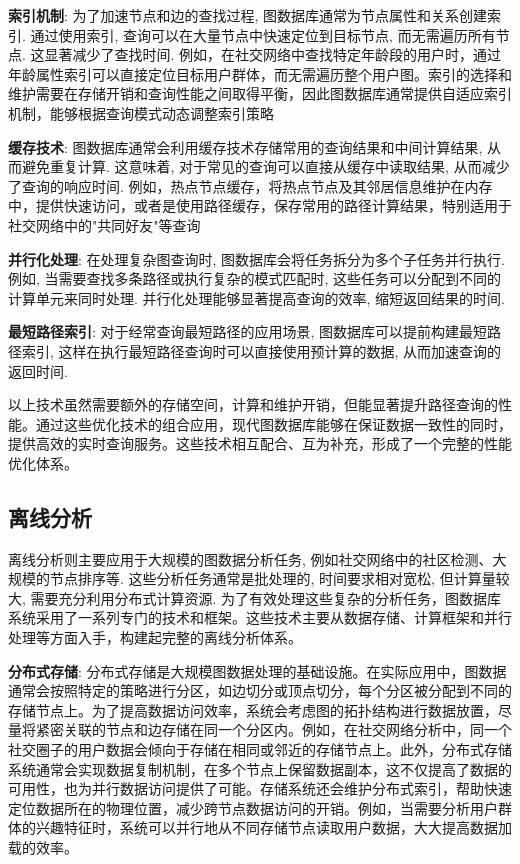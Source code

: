 \textbf{索引机制}: 为了加速节点和边的查找过程, 图数据库通常为节点属性和关系创建索引. 通过使用索引, 查询可以在大量节点中快速定位到目标节点, 而无需遍历所有节点. 这显著减少了查找时间. 例如，在社交网络中查找特定年龄段的用户时，通过年龄属性索引可以直接定位目标用户群体，而无需遍历整个用户图。索引的选择和维护需要在存储开销和查询性能之间取得平衡，因此图数据库通常提供自适应索引机制，能够根据查询模式动态调整索引策略

\textbf{缓存技术}: 图数据库通常会利用缓存技术存储常用的查询结果和中间计算结果, 从而避免重复计算. 这意味着, 对于常见的查询可以直接从缓存中读取结果, 从而减少了查询的响应时间. 例如，热点节点缓存，将热点节点及其邻居信息维护在内存中，提供快速访问，或者是使用路径缓存，保存常用的路径计算结果，特别适用于社交网络中的"共同好友"等查询


\textbf{并行化处理}: 在处理复杂图查询时, 图数据库会将任务拆分为多个子任务并行执行. 例如, 当需要查找多条路径或执行复杂的模式匹配时, 这些任务可以分配到不同的计算单元来同时处理. 并行化处理能够显著提高查询的效率, 缩短返回结果的时间.

\textbf{最短路径索引}: 对于经常查询最短路径的应用场景, 图数据库可以提前构建最短路径索引, 这样在执行最短路径查询时可以直接使用预计算的数据, 从而加速查询的返回时间.

以上技术虽然需要额外的存储空间，计算和维护开销，但能显著提升路径查询的性能。通过这些优化技术的组合应用，现代图数据库能够在保证数据一致性的同时，提供高效的实时查询服务。这些技术相互配合、互为补充，形成了一个完整的性能优化体系。

\subsection{离线分析}

离线分析则主要应用于大规模的图数据分析任务, 例如社交网络中的社区检测、大规模的节点排序等. 这些分析任务通常是批处理的, 时间要求相对宽松, 但计算量较大, 需要充分利用分布式计算资源. 为了有效处理这些复杂的分析任务，图数据库系统采用了一系列专门的技术和框架。这些技术主要从数据存储、计算框架和并行处理等方面入手，构建起完整的离线分析体系。

\textbf{分布式存储}: 分布式存储是大规模图数据处理的基础设施。在实际应用中，图数据通常会按照特定的策略进行分区，如边切分或顶点切分，每个分区被分配到不同的存储节点上。为了提高数据访问效率，系统会考虑图的拓扑结构进行数据放置，尽量将紧密关联的节点和边存储在同一个分区内。例如，在社交网络分析中，同一个社交圈子的用户数据会倾向于存储在相同或邻近的存储节点上。此外，分布式存储系统通常会实现数据复制机制，在多个节点上保留数据副本，这不仅提高了数据的可用性，也为并行数据访问提供了可能。存储系统还会维护分布式索引，帮助快速定位数据所在的物理位置，减少跨节点数据访问的开销。例如，当需要分析用户群体的兴趣特征时，系统可以并行地从不同存储节点读取用户数据，大大提高数据加载的效率。

